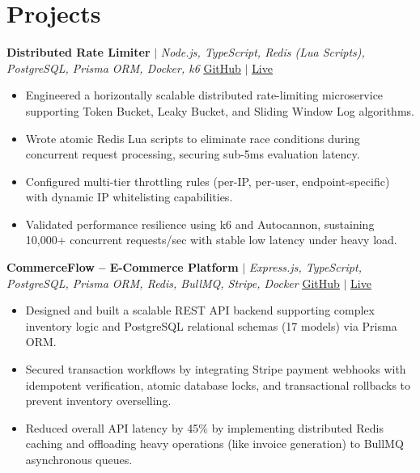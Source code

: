 \documentclass[a4paper,10pt]{article}
\begin{document}
\vspace{-3pt}

\section{Projects}

\noindent
\textbf{Distributed Rate Limiter} $|$ \textit{Node.js, TypeScript, Redis (Lua Scripts), PostgreSQL, Prisma ORM, Docker, k6} \hfill \href{https://github.com/ishanpanwar051}{\underline{GitHub}} $|$ \href{https://github.com/ishanpanwar051}{\underline{Live}}
\begin{itemize}[leftmargin=*, itemsep=1.5pt, parsep=0pt, topsep=1.5pt, partopsep=0pt]
    \item Engineered a horizontally scalable distributed rate-limiting microservice supporting Token Bucket, Leaky Bucket, and Sliding Window Log algorithms.
    \item Wrote atomic Redis Lua scripts to eliminate race conditions during concurrent request processing, securing sub-5ms evaluation latency.
    \item Configured multi-tier throttling rules (per-IP, per-user, endpoint-specific) with dynamic IP whitelisting capabilities.
    \item Validated performance resilience using k6 and Autocannon, sustaining 10,000+ concurrent requests/sec with stable low latency under heavy load.
\end{itemize}

\vspace{1.5pt}

\noindent
\textbf{CommerceFlow -- E-Commerce Platform} $|$ \textit{Express.js, TypeScript, PostgreSQL, Prisma ORM, Redis, BullMQ, Stripe, Docker} \hfill \href{https://github.com/ishanpanwar051}{\underline{GitHub}} $|$ \href{https://github.com/ishanpanwar051}{\underline{Live}}
\begin{itemize}[leftmargin=*, itemsep=1.5pt, parsep=0pt, topsep=1.5pt, partopsep=0pt]
    \item Designed and built a scalable REST API backend supporting complex inventory logic and PostgreSQL relational schemas (17 models) via Prisma ORM.
    \item Secured transaction workflows by integrating Stripe payment webhooks with idempotent verification, atomic database locks, and transactional rollbacks to prevent inventory overselling.
    \item Reduced overall API latency by 45\% by implementing distributed Redis caching and offloading heavy operations (like invoice generation) to BullMQ asynchronous queues.
\end{itemize}
\end{document}
